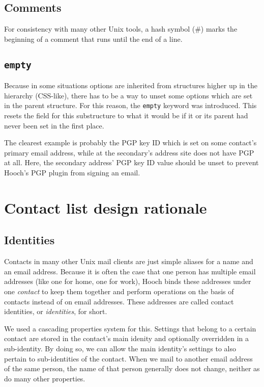 \documentclass[a4paper]{article}
\begin{document}
\subsection{Comments}

For consistency with many other Unix tools, a hash symbol (\#) marks the
beginning of a comment that runs until the end of a line.

\subsection{\texttt{empty}}

Because in some situations options are inherited from structures higher
up in the hierarchy (CSS-like), there has to be a way to unset some
options which are set in the parent structure.  For this reason, the
\texttt{empty} keyword was introduced.  This resets the field for this
substructure to what it would be if it or its parent had never been set
in the first place.

The clearest example is probably the PGP key ID which is set on some
contact's primary email address, while at the secondary's address site
does not have PGP at all.  Here, the secondary address' PGP key ID value
should be unset to prevent Hooch's PGP plugin from signing an email.


\section{Contact list design rationale}

\subsection{Identities}

Contacts in many other Unix mail clients are just simple aliases for a
name and an email address.  Because it is often the case that one person
has multiple email addresses (like one for home, one for work), Hooch
binds these addresses under one \emph{contact} to keep them together and
perform operations on the basis of contacts instead of on email
addresses.  These addresses are called contact identities, or
\emph{identities}, for short.

We used a cascading properties system for this.  Settings that belong to
a certain contact are stored in the contact's main idenity and
optionally overridden in a sub-identity.  By doing so, we can allow the
main identity's settings to also pertain to sub-identities of the
contact.  When we mail to another email address of the same person, the
name of that person generally does not change, neither as do many other
properties.
\end{document}
